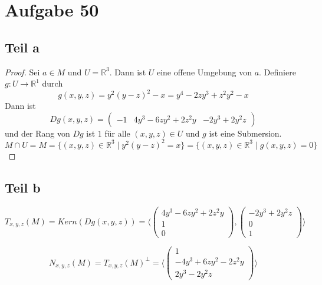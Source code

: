 \documentclass[10pt,a4paper]{article}
\begin{document}
\section{Aufgabe 50}

\subsection{Teil a}

\begin{proof}
  Sei $a \in M$ und $U = \mathbb{R}^{3}$.
  Dann ist $U$ eine offene Umgebung von $a$.
  Definiere $g : U \rightarrow \mathbb{R}^{1}$ durch
  \begin{equation}
    g(x, y, z) = y^{2}(y - z)^{2} - x = y^{4} - 2zy^{3} + z^{2}y^{2} - x
  \end{equation}
  Dann ist
  \begin{equation}
    Dg(x, y, z) = \begin{pmatrix}
      -1 & 4y^{3} - 6zy^{2} + 2z^{2}y & -2y^{3} + 2y^{2}z
    \end{pmatrix}
  \end{equation}
  und der Rang von $Dg$ ist $1$ für alle $(x, y, z) \in U$ und $g$ ist eine Submersion.
  \begin{equation}
    M \cap U = M = \{ (x, y, z) \in \mathbb{R}^{3} \mid y^{2}(y - z)^{2} = x \} = \{ (x, y, z) \in \mathbb{R}^{3} \mid g(x, y, z) = 0 \}
  \end{equation}
\end{proof}

\subsection{Teil b}

\begin{equation}
  T_{x, y, z}(M) = Kern(Dg(x, y, z)) = \langle
  \begin{pmatrix}
    4y^{3} - 6zy^{2} + 2z^{2}y\\1\\0
  \end{pmatrix},
  \begin{pmatrix}
    -2y^{3} + 2y^{2}z\\0\\1
  \end{pmatrix}\rangle
\end{equation}

\begin{equation}
  N_{x, y, z}(M) = T_{x, y, z}(M)^{\perp} = \langle
  \begin{pmatrix}
    1\\-4y^{3} + 6zy^{2} - 2z^{2}y\\2y^{3} - 2y^{2}z
  \end{pmatrix}
  \rangle
\end{equation}
\end{document}
